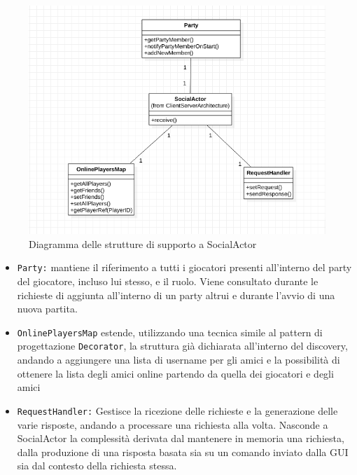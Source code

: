 \begin{figure}[H]
	\includegraphics[width=\textwidth,height=\textheight,keepaspectratio]{socialActor}
	\caption{Diagramma delle strutture di supporto a SocialActor}
\end{figure}

\begin{itemize}
	\item{\texttt{Party:}} mantiene il riferimento a tutti i giocatori presenti all'interno del party del giocatore, incluso lui stesso, e il ruolo. Viene consultato durante le richieste di aggiunta all'interno di un party altrui e durante l'avvio di una nuova partita.
	
	\item{\texttt{OnlinePlayersMap}} estende, utilizzando una tecnica simile al pattern di progettazione \texttt{Decorator}, la struttura già dichiarata all'interno del discovery, andando a aggiungere una lista di username per gli amici e la possibilità di ottenere la lista degli amici online partendo da quella dei giocatori e degli amici
	
	\item{\texttt{RequestHandler:}} Gestisce la ricezione delle richieste e la generazione delle varie risposte, andando a processare una richiesta alla volta. Nasconde a SocialActor la complessità derivata dal mantenere in memoria una richiesta, dalla produzione di una risposta basata sia su un comando inviato dalla GUI sia dal contesto della richiesta stessa. 
	
\end{itemize}

